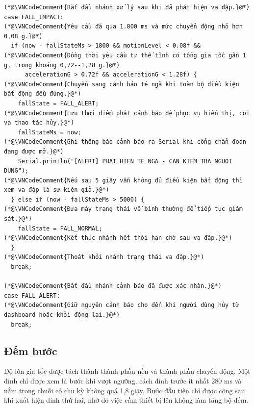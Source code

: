 \documentclass[12pt]{article}
\begin{document}
\begin{lstlisting}[style=firmware,caption={Các điều kiện quyết định trong máy trạng thái té ngã}]
(*@\VNCodeComment{Bắt đầu nhánh xử lý sau khi đã phát hiện va đập.}@*)
case FALL_IMPACT:
(*@\VNCodeComment{Yêu cầu đã qua 1.800 ms và mức chuyển động nhỏ hơn 0,08 g.}@*)
  if (now - fallStateMs > 1800 && motionLevel < 0.08f &&
(*@\VNCodeComment{Đồng thời yêu cầu tư thế tĩnh có tổng gia tốc gần 1 g, trong khoảng 0,72--1,28 g.}@*)
      accelerationG > 0.72f && accelerationG < 1.28f) {
(*@\VNCodeComment{Chuyển sang cảnh báo té ngã khi toàn bộ điều kiện bất động đều đúng.}@*)
    fallState = FALL_ALERT;
(*@\VNCodeComment{Lưu thời điểm phát cảnh báo để phục vụ hiển thị, còi và thao tác hủy.}@*)
    fallStateMs = now;
(*@\VNCodeComment{Ghi thông báo cảnh báo ra Serial khi cổng chẩn đoán đang được mở.}@*)
    Serial.println("[ALERT] PHAT HIEN TE NGA - CAN KIEM TRA NGUOI DUNG");
(*@\VNCodeComment{Nếu sau 5 giây vẫn không đủ điều kiện bất động thì xem va đập là sự kiện giả.}@*)
  } else if (now - fallStateMs > 5000) {
(*@\VNCodeComment{Đưa máy trạng thái về bình thường để tiếp tục giám sát.}@*)
    fallState = FALL_NORMAL;
(*@\VNCodeComment{Kết thúc nhánh hết thời hạn chờ sau va đập.}@*)
  }
(*@\VNCodeComment{Thoát khỏi nhánh trạng thái va đập.}@*)
  break;

(*@\VNCodeComment{Bắt đầu nhánh cảnh báo đã được xác nhận.}@*)
case FALL_ALERT:
(*@\VNCodeComment{Giữ nguyên cảnh báo cho đến khi người dùng hủy từ dashboard hoặc khởi động lại.}@*)
  break;
\end{lstlisting}

\subsection{Đếm bước}

Độ lớn gia tốc được tách thành thành phần nền và thành phần chuyển động. Một đỉnh chỉ được xem là bước khi vượt ngưỡng, cách đỉnh trước ít nhất 280 ms và nằm trong chuỗi có chu kỳ không quá 1,8 giây. Bước đầu tiên chỉ được cộng sau khi xuất hiện đỉnh thứ hai, nhờ đó việc cầm thiết bị lên không làm tăng bộ đếm.
\end{document}
